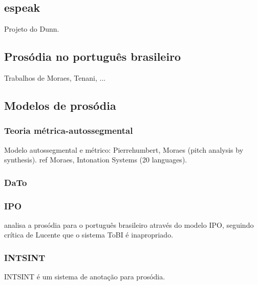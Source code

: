 \subsection{espeak}
Projeto do Dunn.

\subsection{Prosódia no português brasileiro}
Trabalhos de Moraes, Tenani, ...
\subsection{Modelos de prosódia}
\subsubsection{Teoria métrica-autossegmental}
Modelo autossegmental e métrico: Pierrehumbert, Moraes (pitch analysis by synthesis).
ref Moraes, Intonation Systems (20 languages).
\subsubsection{DaTo}

\subsubsection{IPO}
\cite{ipo} analisa a prosódia para o português brasileiro através do modelo IPO,
seguindo crítica de Lucente que o sistema ToBI é inapropriado.
\subsubsection{INTSINT}
INTSINT é um sistema de anotação para prosódia.
